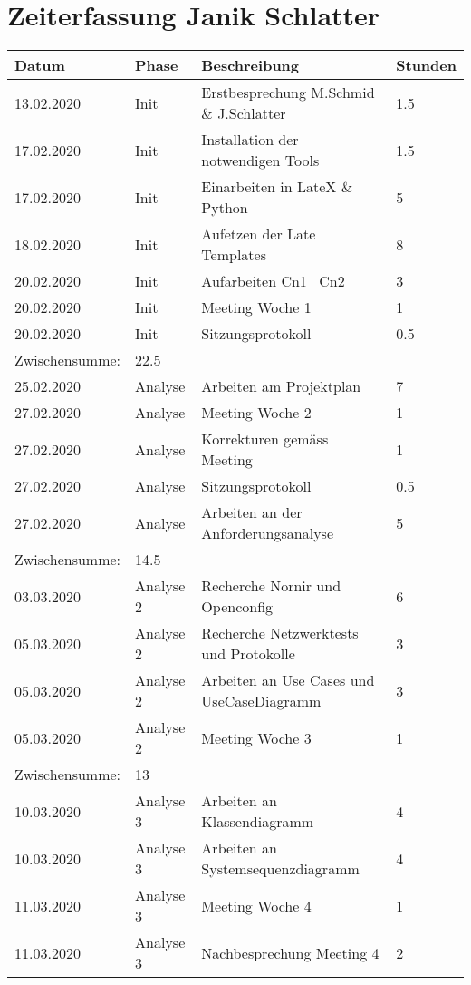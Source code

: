 \documentclass[
	ngerman,
	toc=listof, %
	toc=bibliography, %
	footnotes=multiple, %
	parskip=half, %
	numbers=noendperiod %
]{scrartcl}
\begin{document}
\section{Zeiterfassung Janik Schlatter}
	\begin{tabularx}{\textwidth}{llXl}
		\toprule
		Datum & Phase & Beschreibung & Stunden \\
		\midrule
		13.02.2020 & Init & Erstbesprechung M.Schmid \& J.Schlatter & 1.5 \\
		17.02.2020 & Init & Installation der notwendigen Tools & 1.5 \\
		17.02.2020 & Init & Einarbeiten in LateX \& Python & 5 \\
		18.02.2020 & Init & Aufetzen der Late Templates & 8 \\
		20.02.2020 & Init & Aufarbeiten Cn1 \ Cn2 & 3 \\
		20.02.2020 & Init & Meeting Woche 1 & 1 \\
		20.02.2020 & Init & Sitzungsprotokoll & 0.5 \\
		\midrule
		Zwischensumme: & 22.5 & & \\
		\midrule
		25.02.2020 & Analyse & Arbeiten am Projektplan & 7 \\
		27.02.2020 & Analyse & Meeting Woche 2 & 1 \\
		27.02.2020 & Analyse & Korrekturen gemäss Meeting & 1 \\
		27.02.2020 & Analyse & Sitzungsprotokoll & 0.5 \\
		27.02.2020 & Analyse & Arbeiten an der Anforderungsanalyse & 5 \\
		\midrule
		Zwischensumme: & 14.5 & & \\
		\midrule
		03.03.2020 & Analyse 2 & Recherche Nornir und Openconfig & 6 \\
		05.03.2020 & Analyse 2 & Recherche Netzwerktests und Protokolle & 3 \\
		05.03.2020 & Analyse 2 & Arbeiten an Use Cases und UseCaseDiagramm & 3 \\
		05.03.2020 & Analyse 2 & Meeting Woche 3 & 1 \\
		\midrule
		Zwischensumme: & 13 & & \\
		\midrule
		10.03.2020 & Analyse 3 & Arbeiten an Klassendiagramm & 4 \\
		10.03.2020 & Analyse 3 & Arbeiten an Systemsequenzdiagramm & 4 \\
		11.03.2020 & Analyse 3 & Meeting Woche 4 & 1 \\
		11.03.2020 & Analyse 3 & Nachbesprechung Meeting 4 & 2 \\

\end{tabularx}
\end{document}
